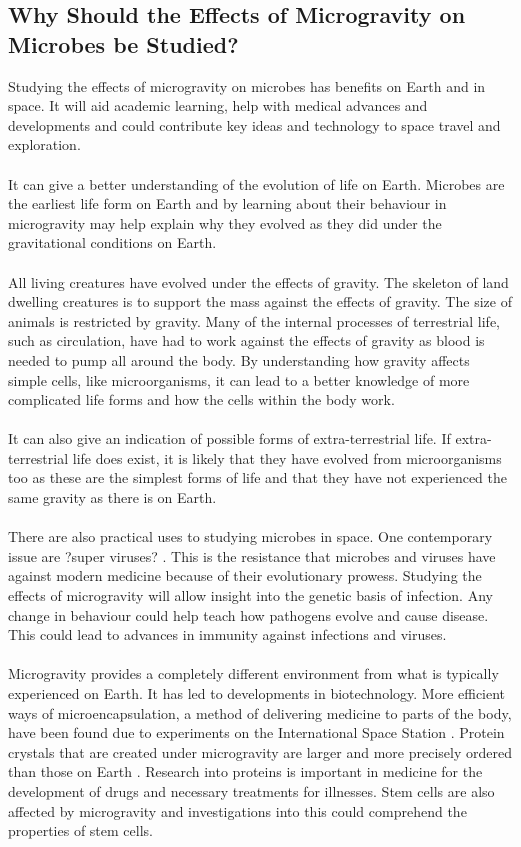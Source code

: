 \documentclass[12pt]{article}
\begin{document}
\subsection{Why Should the Effects of Microgravity on Microbes be Studied?}
Studying the effects of microgravity on microbes has benefits on Earth and in space. It will aid academic learning, help with medical advances and developments and could contribute key ideas and technology to space travel and exploration.
\\ \\It can give a better understanding of the evolution of life on Earth. Microbes are the earliest life form on Earth and by learning about their behaviour in microgravity may help explain why they evolved as they did under the gravitational conditions on Earth.
\\ \\All living creatures have evolved under the effects of gravity.  The skeleton of land dwelling creatures is to support the mass against the effects of gravity. The size of animals is restricted by gravity. Many of the internal processes of terrestrial life, such as circulation, have had to work against the effects of gravity as blood is needed to pump all around the body. By understanding how gravity affects simple cells, like microorganisms, it can lead to a better knowledge of more complicated life forms and how the cells within the body work.
\\ \\It can also give an indication of possible forms of extra-terrestrial life. If extra-terrestrial life does exist, it is likely that they have evolved from microorganisms too as these are the simplest forms of life and that they have not experienced the same gravity as there is on Earth.
\\ \\There are also practical uses to studying microbes in space. One contemporary issue are ?super viruses? . This is the resistance that microbes and viruses have against modern medicine because of their evolutionary prowess. Studying the effects of microgravity will allow insight into the genetic basis of infection. Any change in behaviour could help teach how pathogens evolve and cause disease. This could lead to advances in immunity against infections and viruses.
\\ \\Microgravity provides a completely different environment from what is typically experienced on Earth. It has led to developments in biotechnology. More efficient ways of microencapsulation, a method of delivering medicine to parts of the body, have been found due to experiments on the International Space Station . Protein crystals that are created under microgravity are larger and more precisely ordered than those on Earth . Research into proteins is important in medicine for the development of drugs and necessary treatments for illnesses.  Stem cells are also affected by microgravity  and investigations into this could comprehend the properties of stem cells.
\end{document}
